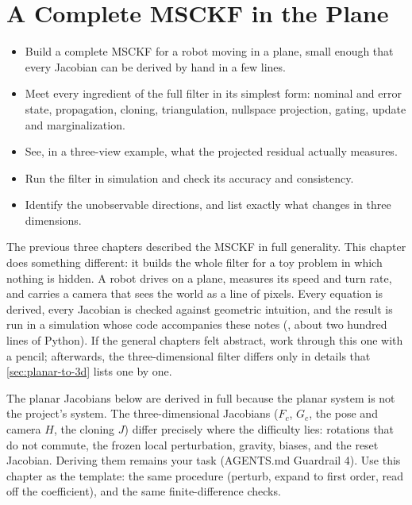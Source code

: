 \chapter{A Complete MSCKF in the Plane}
\label{ch:planar}

\begin{objectives}
\begin{itemize}
  \item Build a complete MSCKF for a robot moving in a plane, small enough that every Jacobian can be derived by hand in a few lines.
  \item Meet every ingredient of the full filter in its simplest form: nominal and error state, propagation, cloning, triangulation,
        nullspace projection, gating, update and marginalization.
  \item See, in a three-view example, what the projected residual actually measures.
  \item Run the filter in simulation and check its accuracy and consistency.
  \item Identify the unobservable directions, and list exactly what changes in three dimensions.
\end{itemize}
\end{objectives}

The previous three chapters described the MSCKF in full generality. This chapter does something different: it builds the whole
filter for a toy problem in which nothing is hidden. A robot drives on a plane, measures its speed and turn rate, and carries a
camera that sees the world as a line of pixels. Every equation is derived, every Jacobian is checked against geometric
intuition, and the result is run in a simulation whose code accompanies these notes
(, about two hundred lines of Python). If the general chapters felt abstract, work through this one with a
pencil; afterwards, the three-dimensional filter differs only in details that \cref{sec:planar-to-3d} lists one by one.

\begin{projectlink}
The planar Jacobians below are derived in full because the planar system is not the project's system. The three-dimensional Jacobians
($F_c$, $G_c$, the pose and camera $H$, the cloning $J$) differ precisely where the difficulty lies: rotations that do not commute, the frozen local
perturbation, gravity, biases, and the reset Jacobian. Deriving them remains your task (AGENTS.md Guardrail 4). Use this chapter as the
template: the same procedure (perturb, expand to first order, read off the coefficient), and the same finite-difference checks.
\end{projectlink}

